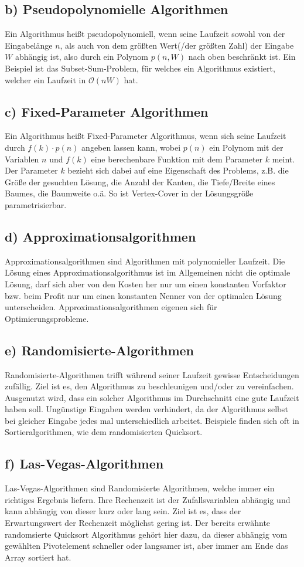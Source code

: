 \documentclass[a4paper,11pt,twoside]{article}
\begin{document}
\subsection*{b) Pseudopolynomielle Algorithmen}
Ein Algorithmus heißt pseudopolynomiell, wenn seine Laufzeit sowohl von der Eingabelänge $n$, als auch von dem größten Wert(/der größten Zahl) der Eingabe $W$ abhängig ist, also durch ein Polynom $p(n,W)$ nach oben beschränkt ist. Ein Beispiel ist das Subset-Sum-Problem, für welches ein Algorithmus existiert, welcher ein Laufzeit in $\mathcal{O}(nW)$ hat.
\subsection*{c) Fixed-Parameter Algorithmen}
Ein Algorithmus heißt Fixed-Parameter Algorithmus, wenn sich seine Laufzeit durch $f(k)\cdot p(n)$ angeben lassen kann, wobei $p(n)$ ein Polynom mit der Variablen $n$ und $f(k)$ eine berechenbare Funktion mit dem Parameter $k$ meint. Der Parameter $k$ bezieht sich dabei auf eine Eigenschaft des Problems, z.B. die Größe der gesuchten Lösung, die Anzahl der Kanten, die Tiefe/Breite eines Baumes, die Baumweite o.ä. So ist Vertex-Cover in der Lösungsgröße parametrisierbar.
\subsection*{d) Approximationsalgorithmen}
Approximationsalgorithmen sind Algorithmen mit polynomieller Laufzeit. Die Lösung eines Approximationsalgorithmus ist im Allgemeinen nicht die optimale Lösung, darf sich aber von den Kosten her nur um einen konstanten Vorfaktor bzw. beim Profit nur um einen konstanten Nenner von der optimalen Lösung unterscheiden. Approximationsalgorithmen eigenen sich für Optimierungsprobleme.
\subsection*{e) Randomisierte-Algorithmen}
Randomisierte-Algorithmen trifft während seiner Laufzeit gewisse Entscheidungen zufällig. Ziel ist es, den Algorithmus zu beschleunigen und/oder zu vereinfachen. Ausgenutzt wird, dass ein solcher Algorithmus im Durchschnitt eine gute Laufzeit haben soll. Ungünstige Eingaben werden verhindert, da der Algorithmus selbst bei gleicher Eingabe jedes mal unterschiedlich arbeitet. Beispiele finden sich oft in Sortieralgorithmen, wie dem randomisierten Quicksort.
\subsection*{f) Las-Vegas-Algorithmen}
Las-Vegas-Algorithmen sind Randomisierte Algorithmen, welche immer ein richtiges Ergebnis liefern. Ihre Rechenzeit ist der Zufallsvariablen abhängig und kann abhängig von dieser kurz oder lang sein. Ziel ist es, dass der Erwartungswert der Rechenzeit möglichst gering ist. Der bereits erwähnte randomsierte Quicksort Algorithmus gehört hier dazu, da dieser abhängig vom gewählten Pivotelement schneller oder langsamer ist, aber immer am Ende das Array sortiert hat.
\end{document}
